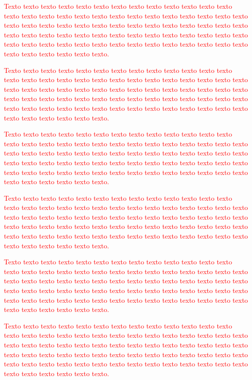 \documentclass[normaltoc, espacoumemeio, pnumromarab,ruledheader]{abnt}
\begin{document}
\textcolor{red}{Texto texto texto texto texto texto texto texto texto texto texto texto texto texto texto texto texto texto texto texto texto texto texto texto texto texto texto texto texto texto texto texto texto texto texto texto texto texto texto texto texto texto texto texto texto texto texto texto texto texto texto texto texto texto texto texto texto texto texto texto texto texto texto texto texto texto texto texto texto texto texto texto texto texto texto.}

\textcolor{red}{Texto texto texto texto texto texto texto texto texto texto texto texto texto texto texto texto texto texto texto texto texto texto texto texto texto texto texto texto texto texto texto texto texto texto texto texto texto texto texto texto texto texto texto texto texto texto texto texto texto texto texto texto texto texto texto texto texto texto texto texto texto texto texto texto texto texto texto texto texto texto texto texto texto texto texto.}

\textcolor{red}{Texto texto texto texto texto texto texto texto texto texto texto texto texto texto texto texto texto texto texto texto texto texto texto texto texto texto texto texto texto texto texto texto texto texto texto texto texto texto texto texto texto texto texto texto texto texto texto texto texto texto texto texto texto texto texto texto texto texto texto texto texto texto texto texto texto texto texto texto texto texto texto texto texto texto texto.}

\textcolor{red}{Texto texto texto texto texto texto texto texto texto texto texto texto texto texto texto texto texto texto texto texto texto texto texto texto texto texto texto texto texto texto texto texto texto texto texto texto texto texto texto texto texto texto texto texto texto texto texto texto texto texto texto texto texto texto texto texto texto texto texto texto texto texto texto texto texto texto texto texto texto texto texto texto texto texto texto.}

\textcolor{red}{Texto texto texto texto texto texto texto texto texto texto texto texto texto texto texto texto texto texto texto texto texto texto texto texto texto texto texto texto texto texto texto texto texto texto texto texto texto texto texto texto texto texto texto texto texto texto texto texto texto texto texto texto texto texto texto texto texto texto texto texto texto texto texto texto texto texto texto texto texto texto texto texto texto texto texto.}

\textcolor{red}{Texto texto texto texto texto texto texto texto texto texto texto texto texto texto texto texto texto texto texto texto texto texto texto texto texto texto texto texto texto texto texto texto texto texto texto texto texto texto texto texto texto texto texto texto texto texto texto texto texto texto texto texto texto texto texto texto texto texto texto texto texto texto texto texto texto texto texto texto texto texto texto texto texto texto texto.}
\end{document}
